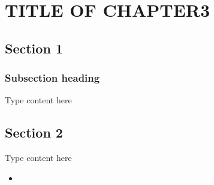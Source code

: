 \chapter{TITLE OF CHAPTER3}
\graphicspath{{Chapter3/}}

\section{Section 1}
\subsection{Subsection heading}
Type content here
\section{Section 2}
Type content here
\begin{itemize}
	\item 
\end{itemize}

